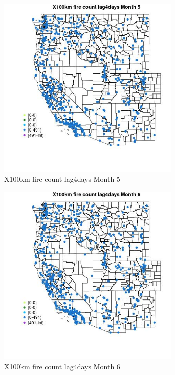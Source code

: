 \begin{figure} 
\centering  
\includegraphics[width=0.77\textwidth]{Code_Outputs/Report_ML_input_PM25_Step4_part_e_de_duplicated_aves_compiled_2019-05-14wNAs_MapObsMo5X100km_fire_count_lag4days.jpg} 
\caption{\label{fig:Report_ML_input_PM25_Step4_part_e_de_duplicated_aves_compiled_2019-05-14wNAsMapObsMo5X100km_fire_count_lag4days}X100km fire count lag4days Month 5} 
\end{figure} 
 

\begin{figure} 
\centering  
\includegraphics[width=0.77\textwidth]{Code_Outputs/Report_ML_input_PM25_Step4_part_e_de_duplicated_aves_compiled_2019-05-14wNAs_MapObsMo6X100km_fire_count_lag4days.jpg} 
\caption{\label{fig:Report_ML_input_PM25_Step4_part_e_de_duplicated_aves_compiled_2019-05-14wNAsMapObsMo6X100km_fire_count_lag4days}X100km fire count lag4days Month 6} 
\end{figure} 
 

